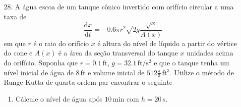 \documentclass[a4paper, 11pt]{report}
\begin{document}
\begin{enumerate}[leftmargin=*]
    \item[28.] A água escoa de um tanque cônico invertido com orifício circular a uma taxa de
    \[
        \frac{\mathrm{d} x}{\mathrm{d} t} = -0.6 \pi r^2 \sqrt{2g} \frac{\sqrt{x}}{A(x)}
    \]
    em que $r$ é o raio do orifício $x$ é altura do nível de líquido a partir do vértice do cone e $A(x)$ é a área da seção transversal do tanque $x$ unidades acima do orifício. Suponha que $r = 0.1 \,\mathrm{ft}$, $g = 32.1 \,\mathrm{ft/s^2}$ e que o tanque tenha um nível inicial de água de $8 \,\mathrm{ft}$ e volume inicial de $512 \frac{\pi}{3} \,\mathrm{ft^3}$. Utilize o método de Runge-Kutta de quarta ordem par encontrar o seguinte
    \begin{enumerate}[leftmargin=*, label=\alph*.]
        \item Cálcule o nível de água após $10 \,\mathrm{min}$ com $h = 20 \,\mathrm{s}$.


\end{enumerate}
\end{enumerate}
\end{document}

